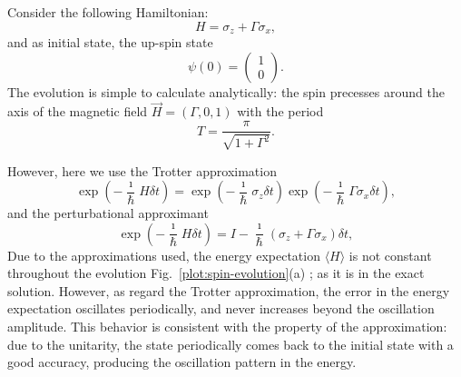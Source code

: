 Consider the following Hamiltonian:
\begin{equation}
H = \sigma_z + \Gamma \sigma_x,
\end{equation}
and as initial state, the up-spin state
\begin{equation}
\psi(0) = 
\begin{pmatrix}
1 \\ 0
\end{pmatrix}.
\end{equation}
The evolution is simple to calculate analytically: the spin precesses around the axis of the magnetic field $\vec{H} = (\Gamma, 0, 1)$ with the period
\begin{equation}
T = \frac{\pi}{\sqrt{1+\Gamma^2}}.
\end{equation}

However, here we use the Trotter approximation
\begin{equation} \label{eq:trotter-approximant}
\exp\left({-\frac{\imath}{\hbar}H \delta t}\right) = \exp\left({-\frac{\imath}{\hbar} \sigma_z \delta t}\right) \exp\left({-\frac{\imath}{\hbar} \Gamma \sigma_x \delta t}\right),
\end{equation}
and the perturbational approximant
\begin{equation} \label{eq:perturbational-approximant}
\exp\left({-\frac{\imath}{\hbar}H \delta t}\right) = I - \frac{\imath}{\hbar}(\sigma_z + \Gamma\sigma_x) \delta t,
\end{equation}
Due to the approximations used, the energy expectation $\langle H \rangle$ is not constant throughout the evolution Fig.~\ref{plot:spin-evolution}(a) ; as it is in the exact solution. However, as regard the Trotter approximation, the error in the energy expectation oscillates periodically, and never increases beyond the oscillation amplitude. This behavior is consistent with the property of the approximation: due to the unitarity, the state periodically comes back to the initial state with a good accuracy, producing the oscillation pattern in the energy.


